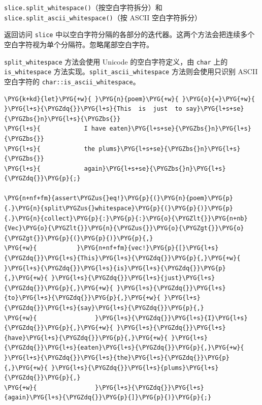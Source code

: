 \begin{myNote}
\texttt{slice.split\_whitespace()}（按空白字符拆分）和 \texttt{slice.split\_ascii\_whitespace()}（按 ASCII 空白字符拆分）
\end{myNote}

返回访问 \texttt{slice} 中以空白字符分隔的各部分的迭代器。这两个方法会把连续多个空白字符视为单个分隔符。忽略尾部空白字符。

\texttt{split\_whitespace} 方法会使用 Unicode 的空白字符定义，由 \texttt{char} 上的 \texttt{is\_whitespace} 方法实现。\texttt{split\_ascii\_whitespace} 方法则会使用只识别 ASCII 空白字符的 \texttt{char::is\_ascii\_whitespace}。

\begin{Verbatim}[commandchars=\\\{\},breaklines=true,breakanywhere=true,fontsize=\codefont,xleftmargin=17bp]
\PYG{k+kd}{let}\PYG{+w}{ }\PYG{n}{poem}\PYG{+w}{ }\PYG{o}{=}\PYG{+w}{ }\PYG{l+s}{\PYGZdq{}}\PYG{l+s}{This  is  just  to say}\PYG{l+s+se}{\PYGZbs{}n}\PYG{l+s}{\PYGZbs{}}
\PYG{l+s}{            I have eaten}\PYG{l+s+se}{\PYGZbs{}n}\PYG{l+s}{\PYGZbs{}}
\PYG{l+s}{            the plums}\PYG{l+s+se}{\PYGZbs{}n}\PYG{l+s}{\PYGZbs{}}
\PYG{l+s}{            again}\PYG{l+s+se}{\PYGZbs{}n}\PYG{l+s}{\PYGZdq{}}\PYG{p}{;}

\PYG{n+nf+fm}{assert\PYGZus{}eq!}\PYG{p}{(}\PYG{n}{poem}\PYG{p}{.}\PYG{n}{split\PYGZus{}whitespace}\PYG{p}{(}\PYG{p}{)}\PYG{p}{.}\PYG{n}{collect}\PYG{p}{:}\PYG{p}{:}\PYG{o}{\PYGZlt{}}\PYG{n+nb}{Vec}\PYG{o}{\PYGZlt{}}\PYG{n}{\PYGZus{}}\PYG{o}{\PYGZgt{}}\PYG{o}{\PYGZgt{}}\PYG{p}{(}\PYG{p}{)}\PYG{p}{,}
\PYG{+w}{           }\PYG{n+nf+fm}{vec!}\PYG{p}{[}\PYG{l+s}{\PYGZdq{}}\PYG{l+s}{This}\PYG{l+s}{\PYGZdq{}}\PYG{p}{,}\PYG{+w}{ }\PYG{l+s}{\PYGZdq{}}\PYG{l+s}{is}\PYG{l+s}{\PYGZdq{}}\PYG{p}{,}\PYG{+w}{ }\PYG{l+s}{\PYGZdq{}}\PYG{l+s}{just}\PYG{l+s}{\PYGZdq{}}\PYG{p}{,}\PYG{+w}{ }\PYG{l+s}{\PYGZdq{}}\PYG{l+s}{to}\PYG{l+s}{\PYGZdq{}}\PYG{p}{,}\PYG{+w}{ }\PYG{l+s}{\PYGZdq{}}\PYG{l+s}{say}\PYG{l+s}{\PYGZdq{}}\PYG{p}{,}
\PYG{+w}{                }\PYG{l+s}{\PYGZdq{}}\PYG{l+s}{I}\PYG{l+s}{\PYGZdq{}}\PYG{p}{,}\PYG{+w}{ }\PYG{l+s}{\PYGZdq{}}\PYG{l+s}{have}\PYG{l+s}{\PYGZdq{}}\PYG{p}{,}\PYG{+w}{ }\PYG{l+s}{\PYGZdq{}}\PYG{l+s}{eaten}\PYG{l+s}{\PYGZdq{}}\PYG{p}{,}\PYG{+w}{ }\PYG{l+s}{\PYGZdq{}}\PYG{l+s}{the}\PYG{l+s}{\PYGZdq{}}\PYG{p}{,}\PYG{+w}{ }\PYG{l+s}{\PYGZdq{}}\PYG{l+s}{plums}\PYG{l+s}{\PYGZdq{}}\PYG{p}{,}
\PYG{+w}{                }\PYG{l+s}{\PYGZdq{}}\PYG{l+s}{again}\PYG{l+s}{\PYGZdq{}}\PYG{p}{]}\PYG{p}{)}\PYG{p}{;}
\end{Verbatim}

